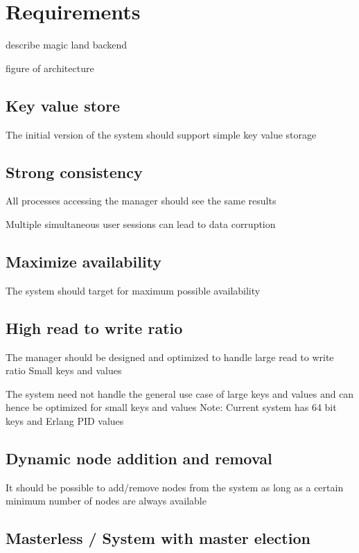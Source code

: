 \chapter{Requirements}
\label{chapter:requirements}

{describe magic land backend}

{figure of architecture}

\section{Key value store}

The initial version of the system should support simple key value storage

\section{Strong consistency}

All processes accessing the manager should see the same results

Multiple simultaneous user sessions can lead to data corruption

\section{Maximize availability}

The system should target for maximum possible availability

\section{High read to write ratio}

The manager should be designed and optimized to handle large read to write ratio
Small keys and values

The system need not handle the general use case of large keys and values and can
hence be optimized for small keys and values
Note: Current system has 64 bit keys and Erlang PID values

\section{Dynamic node addition and removal}

It should be possible to add/remove nodes from the system as long as a certain 
minimum number of nodes are always available

\section{Masterless / System with master election}

